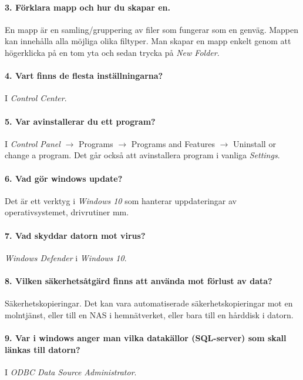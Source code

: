 \paragraph{3. Förklara mapp och hur du skapar en.} En mapp är en samling/gruppering av filer som fungerar som en genväg. Mappen kan innehålla alla möjliga olika filtyper. Man skapar en mapp enkelt genom att högerklicka på en tom yta och sedan trycka på \textit{New Folder}.

\paragraph{4. Vart finns de flesta inställningarna?}
I \textit{Control Center}.

\paragraph{5. Var avinstallerar du ett program?}
I \textit{Control Panel} $\rightarrow$ Programs $\rightarrow$ Programs and Features $\rightarrow$ Uninstall or change a program. Det går också att avinstallera program i vanliga \textit{Settings}.

\paragraph{6. Vad gör windows update?}
Det är ett verktyg i \textit{Windows 10} som hanterar uppdateringar av operativsystemet, drivrutiner mm.

\paragraph{7. Vad skyddar datorn mot virus?}
\textit{Windows Defender} i \textit{Windows 10}.

\paragraph{8. Vilken säkerhetsåtgärd finns att använda mot förlust av data?}
Säkerhetskopieringar. Det kan vara automatiserade säkerhetskopieringar mot en molntjänst, eller till en NAS i hemnätverket, eller bara till en hårddisk i datorn.

\paragraph{9. Var i windows anger man vilka datakällor (SQL-server) som skall länkas till datorn?}
I \textit{ODBC Data Source Administrator}.

